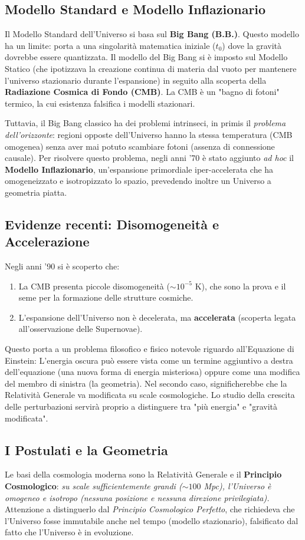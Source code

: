 \documentclass[11pt,a4paper]{report}
\begin{document}
\subsection{Modello Standard e Modello Inflazionario}
Il Modello Standard dell'Universo si basa sul \textbf{Big Bang (B.B.)}. Questo modello ha un limite: porta a una singolarità matematica iniziale ($t_0$) dove la gravità dovrebbe essere quantizzata. 
Il modello del Big Bang si è imposto sul Modello Statico (che ipotizzava la creazione continua di materia dal vuoto per mantenere l'universo stazionario durante l'espansione) in seguito alla scoperta della \textbf{Radiazione Cosmica di Fondo (CMB)}. La CMB è un "bagno di fotoni" termico, la cui esistenza falsifica i modelli stazionari.

Tuttavia, il Big Bang classico ha dei problemi intrinseci, in primis il \textit{problema dell'orizzonte}: regioni opposte dell'Universo hanno la stessa temperatura (CMB omogenea) senza aver mai potuto scambiare fotoni (assenza di connessione causale). Per risolvere questo problema, negli anni '70 è stato aggiunto \textit{ad hoc} il \textbf{Modello Inflazionario}, un'espansione primordiale iper-accelerata che ha omogeneizzato e isotropizzato lo spazio, prevedendo inoltre un Universo a geometria piatta.

\subsection{Evidenze recenti: Disomogeneità e Accelerazione}
Negli anni '90 si è scoperto che:
\begin{enumerate}
    \item La CMB presenta piccole disomogeneità ($\sim 10^{-5}$ K), che sono la prova e il seme per la formazione delle strutture cosmiche.
    \item L'espansione dell'Universo non è decelerata, ma \textbf{accelerata} (scoperta legata all'osservazione delle Supernovae).
\end{enumerate}
Questo porta a un problema filosofico e fisico notevole riguardo all'Equazione di Einstein:
L'energia oscura può essere vista come un termine aggiuntivo a destra dell'equazione (una nuova forma di energia misteriosa) oppure come una modifica del membro di sinistra (la geometria). Nel secondo caso, significherebbe che la Relatività Generale va modificata su scale cosmologiche. Lo studio della crescita delle perturbazioni servirà proprio a distinguere tra "più energia" e "gravità modificata".


\subsection{I Postulati e la Geometria}
Le basi della cosmologia moderna sono la Relatività Generale e il \textbf{Principio Cosmologico}: \textit{su scale sufficientemente grandi ($\sim 100$ Mpc), l'Universo è omogeneo e isotropo (nessuna posizione e nessuna direzione privilegiata).} 
Attenzione a distinguerlo dal \textit{Principio Cosmologico Perfetto}, che richiedeva che l'Universo fosse immutabile anche nel tempo (modello stazionario), falsificato dal fatto che l'Universo è in evoluzione.
\end{document}
